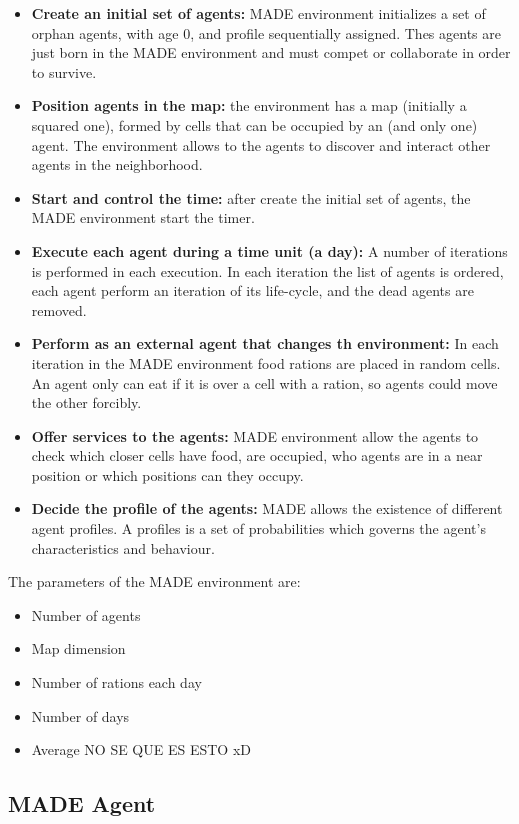 \documentclass[runningheads]{llncs}
\begin{document}
\begin{itemize}
\item \textbf{Create an initial set of agents:} MADE environment initializes a set of orphan agents, with age 0, and profile sequentially assigned. Thes agents are just born in the MADE environment and must compet or collaborate in order to survive.
\item \textbf{Position agents in the map:} the environment has a map (initially a squared one), formed by cells that can be occupied by an (and only one) agent. The environment allows to the agents to discover and interact other agents in the neighborhood.
\item \textbf{Start and control the time:} after create the initial set of agents, the MADE environment start the timer.
\item \textbf{Execute each agent during a time unit (a day):} A number of iterations is performed in each execution. In each iteration the list of agents is ordered, each agent perform an iteration of its life-cycle, and the dead agents are removed.
\item \textbf{Perform as an external agent that changes th environment:} In each iteration in the MADE environment food rations are placed in random cells. An agent only can eat if it is over a cell with a ration, so agents could move the other forcibly.
\item \textbf{Offer services to the agents:} MADE environment allow the agents to check which closer cells have food, are occupied, who agents are in a near position or which positions can they occupy.
\item \textbf{Decide the profile of the agents:} MADE allows the existence of different agent profiles. A profiles is a set of probabilities which governs the agent's characteristics and behaviour.
\end{itemize}

The parameters of the MADE environment are:
\begin{itemize}
\item Number of agents
\item Map dimension
\item Number of rations each day
\item Number of days
\item Average NO SE QUE ES ESTO xD
\end{itemize}
\subsection{MADE Agent}
\end{document}
